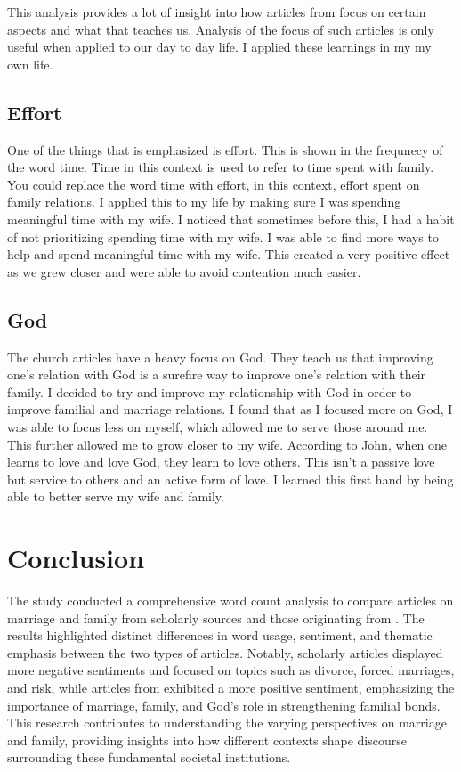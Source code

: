 \documentclass[twocolumn]{article}
\begin{document}
This analysis provides a lot of insight into how articles from \church focus on certain aspects and what that teaches us. Analysis of the focus of such articles is only useful when applied to our day to day life. I applied these learnings in my my own life.

\subsection{Effort}

One of the things that is emphasized is effort. This is shown in the frequnecy of the word time. Time in this context is used to refer to time spent with family. You could replace the word time with effort, in this context, effort spent on family relations. I applied this to my life by making sure I was spending meaningful time with my wife. I noticed that sometimes before this, I had a habit of not prioritizing spending time with my wife. I was able to find more ways to help and spend meaningful time with my wife. This created a very positive effect as we grew closer and were able to avoid contention much easier. 

\subsection{God}

The church articles have a heavy focus on God. They teach us that improving one's relation with God is a surefire way to improve one's relation with their family. I decided to try and improve my relationship with God in order to improve familial and marriage relations. I found that as I focused more on God, I was able to focus less on myself, which allowed me to serve those around me. This further allowed me to grow closer to my wife. According to John, when one learns to love and love God, they learn to love others. This isn't a passive love but service to others and an active form of love. I learned this first hand by being able to better serve my wife and family. 

\section{Conclusion}

The study conducted a comprehensive word count analysis to compare articles on marriage and family from scholarly sources and those originating from \church. The results highlighted distinct differences in word usage, sentiment, and thematic emphasis between the two types of articles. Notably, scholarly articles displayed more negative sentiments and focused on topics such as divorce, forced marriages, and risk, while articles from \church  exhibited a more positive sentiment, emphasizing the importance of marriage, family, and God's role in strengthening familial bonds. This research contributes to understanding the varying perspectives on marriage and family, providing insights into how different contexts shape discourse surrounding these fundamental societal institutions.

% 
\end{document}
